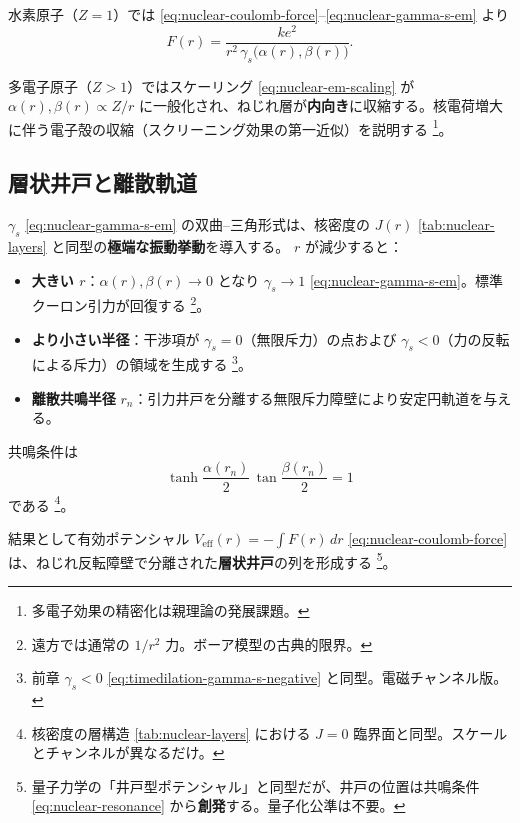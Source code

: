 \documentclass[dvipdfmx,a4paper,oneside]{jsbook}
\numberwithin{equation}{chapter}
\begin{document}
水素原子（\(Z = 1\)）では \eqref{eq:nuclear-coulomb-force}–\eqref{eq:nuclear-gamma-s-em} より
\begin{equation}
  F(r) = \frac{k e^{2}}{r^{2}\,\gamma_s\!\bigl(\alpha(r), \beta(r)\bigr)}.
  \label{eq:nuclear-hydrogen-force}
\end{equation}

多電子原子（\(Z > 1\)）ではスケーリング \eqref{eq:nuclear-em-scaling} が \(\alpha(r), \beta(r) \propto Z/r\) に一般化され、ねじれ層が\textbf{内向き}に収縮する。核電荷増大に伴う電子殻の収縮（スクリーニング効果の第一近似）を説明する \footnote{多電子効果の精密化は親理論の発展課題。}。

\subsection{層状井戸と離散軌道}

\(\gamma_s\) \eqref{eq:nuclear-gamma-s-em} の双曲--三角形式は、核密度の \(J(r)\) \eqref{tab:nuclear-layers} と同型の\textbf{極端な振動挙動}を導入する。
\(r\) が減少すると：

\begin{itemize}[leftmargin=2em]
  \item \textbf{大きい \(r\)}：\(\alpha(r), \beta(r) \to 0\) となり \(\gamma_s \to 1\) \eqref{eq:nuclear-gamma-s-em}。標準クーロン引力が回復する \footnote{遠方では通常の \(1/r^2\) 力。ボーア模型の古典的限界。}。
  \item \textbf{より小さい半径}：干渉項が \(\gamma_s = 0\)（無限斥力）の点および \(\gamma_s < 0\)（力の反転による斥力）の領域を生成する \footnote{前章 \(\gamma_s < 0\) \eqref{eq:timedilation-gamma-s-negative} と同型。電磁チャンネル版。}。
  \item \textbf{離散共鳴半径} \(r_n\)：引力井戸を分離する無限斥力障壁により安定円軌道を与える。
\end{itemize}

共鳴条件は
\begin{equation}
  \tanh\!\frac{\alpha(r_n)}{2}\,\tan\!\frac{\beta(r_n)}{2} = 1
  \label{eq:nuclear-resonance}
\end{equation}
である \footnote{核密度の層構造 \eqref{tab:nuclear-layers} における \(J = 0\) 臨界面と同型。スケールとチャンネルが異なるだけ。}。

結果として有効ポテンシャル \(V_{\mathrm{eff}}(r) = -\int F(r)\, dr\) \eqref{eq:nuclear-coulomb-force} は、ねじれ反転障壁で分離された\textbf{層状井戸}の列を形成する \footnote{量子力学の「井戸型ポテンシャル」と同型だが、井戸の位置は共鳴条件 \eqref{eq:nuclear-resonance} から\textbf{創発}する。量子化公準は不要。}。
\end{document}
